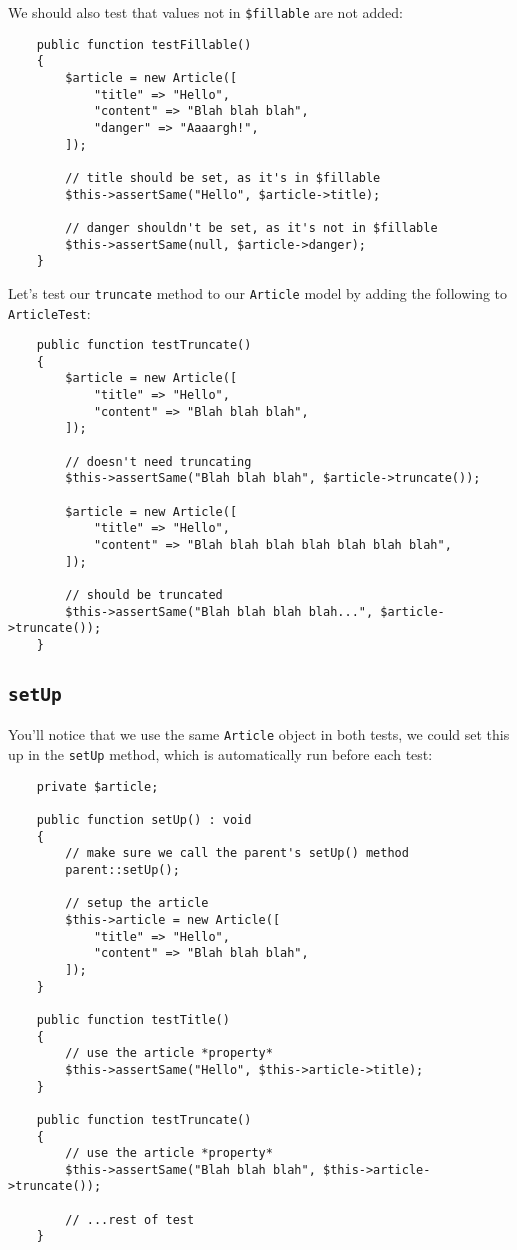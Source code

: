 We should also test that values not in \texttt{\$fillable} are not added:

\begin{verbatim}
    public function testFillable()
    {
        $article = new Article([
            "title" => "Hello",
            "content" => "Blah blah blah",
            "danger" => "Aaaargh!",
        ]);

        // title should be set, as it's in $fillable
        $this->assertSame("Hello", $article->title);

        // danger shouldn't be set, as it's not in $fillable
        $this->assertSame(null, $article->danger);
    }
\end{verbatim}

Let's test our \texttt{truncate} method to our \texttt{Article} model by adding the following to \texttt{ArticleTest}:

\begin{verbatim}
    public function testTruncate()
    {
        $article = new Article([
            "title" => "Hello",
            "content" => "Blah blah blah",
        ]);

        // doesn't need truncating
        $this->assertSame("Blah blah blah", $article->truncate());

        $article = new Article([
            "title" => "Hello",
            "content" => "Blah blah blah blah blah blah blah",
        ]);

        // should be truncated
        $this->assertSame("Blah blah blah blah...", $article->truncate());
    }
\end{verbatim}


\subsection{\texttt{setUp}}

You'll notice that we use the same \texttt{Article} object in both tests, we could set this up in the \texttt{setUp} method, which is automatically run before each test:

\begin{verbatim}
    private $article;

    public function setUp() : void
    {
        // make sure we call the parent's setUp() method
        parent::setUp();

        // setup the article
        $this->article = new Article([
            "title" => "Hello",
            "content" => "Blah blah blah",
        ]);
    }

    public function testTitle()
    {
        // use the article *property*
        $this->assertSame("Hello", $this->article->title);
    }

    public function testTruncate()
    {
        // use the article *property*
        $this->assertSame("Blah blah blah", $this->article->truncate());

        // ...rest of test
    }
\end{verbatim}


